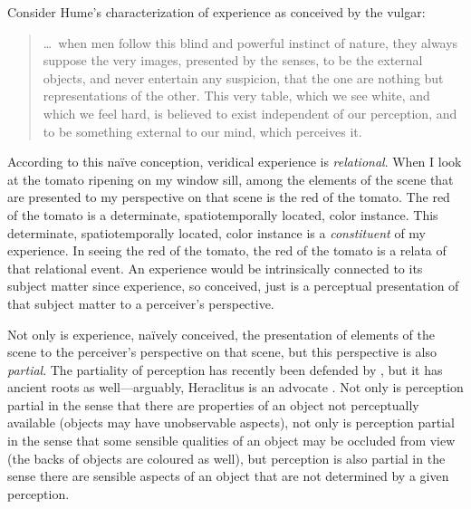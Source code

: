 \documentclass[12pt]{article}
\begin{document}
Consider Hume's characterization of experience as conceived by the vulgar:
\begin{quote}
    \ldots\ when men follow this blind and powerful instinct of nature, they always suppose the very images, presented by the senses, to be the external objects, and never entertain any suspicion, that the one are nothing but representations of the other. This very table, which we see white, and which we feel hard, is believed to exist independent of our perception, and to be something external to our mind, which perceives it. \citep[113--4]{Hume:1740lr}
\end{quote}
According to this naïve conception, veridical experience is \emph{relational}. When I look at the tomato ripening on my window sill, among the elements of the scene that are presented to my perspective on that scene is the red of the tomato. The red of the tomato is a determinate, spatiotemporally located, color instance. This determinate, spatiotemporally located, color instance is a \emph{constituent} of my experience. In seeing the red of the tomato, the red of the tomato is a relata of that relational event. An experience would be intrinsically connected to its subject matter since experience, so conceived, just is a perceptual presentation of that subject matter to a perceiver's perspective.

Not only is experience, naïvely conceived, the presentation of elements of the scene to the perceiver's perspective on that scene, but this perspective is also \emph{partial}. The partiality of perception has recently been defended by \citet{Hilbert:1987jq}, but it has ancient roots as well---arguably, Heraclitus is an advocate \citep[see][]{Burnyeat:1979mv,Kalderon:2006tg}. Not only is perception partial in the sense that there are properties of an object not perceptually available (objects may have unobservable aspects), not only is perception partial in the sense that some sensible qualities of an object may be occluded from view (the backs of objects are coloured as well), but perception is also partial in the sense there are sensible aspects of an object that are not determined by a given perception. 
\end{document}
